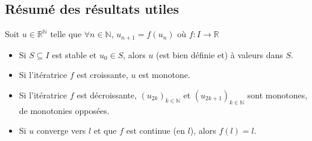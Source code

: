 \documentclass[10pt,a4paper]{article}
\theoremstyle{definition}
\begin{document}
\subsection{Résumé des résultats utiles}
\noindent Soit $u \in \mathbb{R}^\mathbb{N}$ telle que $\forall n \in \mathbb{N}$, $u_{n + 1} = f(u_n)$ où $f: I \to \mathbb{R}$
\begin{itemize}
\item Si $S \subseteq I$ est stable et $u_0 \in S$, alors $u$ (est bien définie et) à valeurs dans $S$.
\item Si l'itératrice $f$ est croissante, $u$ est monotone.
\item Si l'itératrice $f$ est décroissante, $(u_{2k})_{k \in \mathbb{N}}$ et $(u_{2k + 1})_{k \in \mathbb{N}}$ sont monotones, de monotonies opposées.
\item Si $u$ converge vers $l$ et que $f$ est continue (en $l$), alors $f(l) = l$.
\end{itemize}
\end{document}
